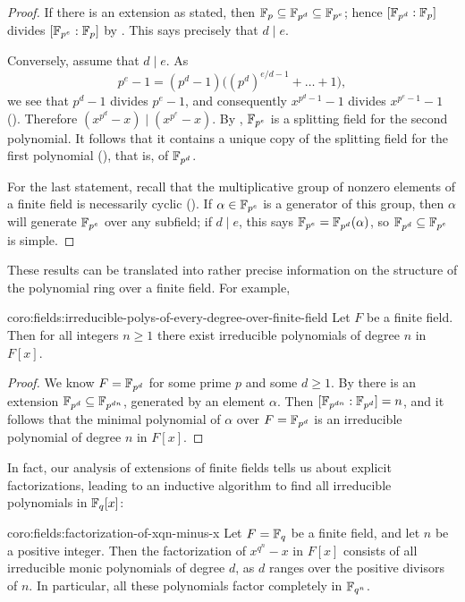 \begin{proof}
  If there is an extension as stated, then
  $\mathbb{F}_p \subseteq \mathbb{F}_{p^d} \subseteq \mathbb{F}_{p^e}$; hence
  $[\mathbb{F}_{p^d} : \mathbb{F}_p]$ divides $[\mathbb{F}_{p^e} : \mathbb{F}_p]$ by
  . This says precisely that $d \mid e$.

  Conversely, assume that $d \mid e$. As
  \[
    p^e - 1 = (p^d - 1)\bigl((p^d)^{e/d - 1} + \dots + 1\bigr),
  \]
  we see that $p^d - 1$ divides $p^e - 1$, and consequently
  $x^{p^d - 1} - 1$ divides $x^{p^e - 1} - 1$
  (). Therefore
  $(x^{p^d} - x) \mid (x^{p^e} - x)$. By ,
  $\mathbb{F}_{p^e}$ is a splitting field for the second polynomial. It
  follows that it contains a unique copy of the splitting field for
  the first polynomial
  (),
  that is, of $\mathbb{F}_{p^d}$.

  For the last statement, recall that the multiplicative group of
  nonzero elements of a finite field is necessarily cyclic
  (). If $\alpha \in \mathbb{F}_{p^e}$ is a generator
  of this group, then $\alpha$ will generate $\mathbb{F}_{p^e}$ over any
  subfield; if $d \mid e$, this says $\mathbb{F}_{p^e} = \mathbb{F}_{p^d}(\alpha)$, so
  $\mathbb{F}_{p^d} \subseteq \mathbb{F}_{p^e}$ is simple.
\end{proof}
These results can be translated into rather precise information on the
structure of the polynomial ring over a finite field. For example,
\begin{coro}{}{coro:fields:irreducible-polys-of-every-degree-over-finite-field}
  Let $F$ be a finite field. Then for all integers $n \geq 1$ there
  exist irreducible polynomials of degree $n$ in $F[x]$.
\end{coro}
\begin{proof}
  We know $F = \mathbb{F}_{p^d}$ for some prime $p$ and some $d \geq 1$.  By
   there is an extension
  $\mathbb{F}_{p^d} \subseteq \mathbb{F}_{p^{dn}}$, generated by an element
  $\alpha$. Then $[\mathbb{F}_{p^{dn}} : \mathbb{F}_{p^d}] = n$, and it follows that
  the minimal polynomial of $\alpha$ over $F = \mathbb{F}_{p^d}$ is an
  irreducible polynomial of degree $n$ in $F[x]$.
\end{proof}
In fact, our analysis of extensions of finite fields tells us about
explicit factorizations, leading to an inductive algorithm to find all
irreducible polynomials in $\mathbb{F}_q[x]$:
\begin{coro}{}{coro:fields:factorization-of-xqn-minus-x}
  Let $F = \mathbb{F}_q$ be a finite field, and let $n$ be a positive
  integer. Then the factorization of $x^{q^n} - x$ in $F[x]$ consists
  of all irreducible monic polynomials of degree $d$, as $d$ ranges
  over the positive divisors of $n$. In particular, all these
  polynomials factor completely in $\mathbb{F}_{q^n}$.
\end{coro}
